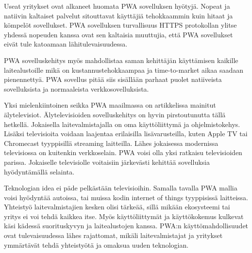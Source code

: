 \documentclass{tktltiki}
\begin{document}
Useat yritykset ovat alkaneet huomata PWA sovelluksen hyötyjä. Nopeat ja natiivin kaltaiset palvelut sitouttavat käyttäjiä tehokkaammin kuin hitaat ja kömpelöt sovellukset. PWA sovelluksen turvallisuus HTTPS protokollan ylitse yhdessä nopeuden kanssa ovat sen kaltaisia muuttujia, että PWA sovellukset eivät tule katoamaan lähitulevaisuudessa. \cite{8441701} 

PWA sovelluskehitys myös mahdollistaa saman kehittäjän käyttämisen kaikille laitealustoille mikä on kustannustehokkaampaa ja time-to-market aikaa saadaan pienennettyä. PWA sovellus pitää siis sisällään parhaat puolet natiiveista sovelluksista ja normaaleista verkkosovelluksista. 

Yksi mielenkiintoinen seikka PWA maailmassa on artikkelissa \cite{8287006} mainitut älytelevisiot. Älytelevisioiden sovelluskehitys on hyvin pirstoutunutta tällä hetkellä. Jokaisella laitevalmistajalla on oma käyttöliittymä ja ohjelmistokehys. Lisäksi televisioita voidaan laajentaa erilaisilla lisävarusteilla, kuten Apple TV tai Chromecast tyyppisillä streaming laitteilla. Lähes jokaisessa modernissa televisiossa on kuitenkin verkkoselain. PWA voisi olla yksi ratkaisu televisioiden parissa. Jokaiselle televisiolle voitaisiin järkevästi kehittää sovelluksia hyödyntämällä selainta. 

Teknologian idea ei päde pelkästään televisioihin. Samalla tavalla PWA mallia voisi hyödyntää autoissa, tai muissa kodin internet of things tyyppisissä laitteissa. Yhteistyö laitevalmistajien kesken olisi tärkeää, sillä mikään ekosysteemi tai yritys ei voi tehdä kaikkea itse. Myös käyttöliittymät ja käyttökokemus kulkevat käsi kädessä suorituskyvyn ja laitealustojen kanssa. PWA:n käyttömahdollisuudet ovat tulevaisuudessa lähes rajattomat, mikäli laitevalmistajat ja yritykset ymmärtävät tehdä yhteistyötä ja omaksua uuden teknologian. 

%
%


%

\clearpage


\lastpage

\appendices
\end{document}
